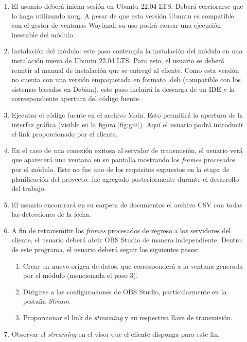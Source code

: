 \begin{enumerate}
	\item El usuario deberá iniciar sesión en Ubuntu 22.04 LTS. Deberá cerciorarse que lo haga utilizando xorg. A pesar de que esta versión Ubuntu es compatible con el gestor de ventanas Wayland, su uso podrá causar una ejecución inestable del módulo. 
	\item Instalación del módulo: este paso contempla la instalación del módulo en una instalación nueva de Ubuntu 22.04 LTS. Para esto, el usuario se deberá remitir al manual de instalación que se entregó al cliente. Como esta versión no cuenta con una versión empaquetada en formato .deb (compatible con los sistemas basados en Debian), este paso incluirá la descarga de un IDE y la correspondiente apertura del código fuente.
	\item Ejecutar el código fuente en el archivo Main. Esto permitirá la apertura de la interfaz gráfica (visible en la figura \ref{fig:gui}). Aquí el usuario podrá introducir el link proporcionado por el cliente.
	\item En el caso de una conexión exitosa al servidor de transmisión, el usuario verá que aparecerá una ventana en su pantalla mostrando los \textit{frames} procesados por el módulo. Este no fue uno de los requisitos expuestos en la etapa de planificación del proyecto: fue agregado posteriormente durante el desarrollo del trabajo.  
	\item El usuario encontrará en su carpeta de documentos el archivo CSV con todas las detecciones de la fecha.
	\item A fin de retransmitir los \textit{frames} procesados de regreso a los servidores del cliente, el usuario deberá abrir OBS Studio de manera independiente. Dentro de este programa, el usuario deberá seguir los siguientes pasos:
	\begin{enumerate}
		\item Crear un nuevo origen de datos, que corresponderá a la ventana generada por el módulo (mencionada el paso 3).
		\item Dirigirse a las configuraciones de OBS Studio, particularmente en la pestaña \textit{Stream}.
		\item Proporcionar el link de \textit{streaming} y su respectiva llave de transmisión.
	\end{enumerate}
	\item Observar el \textit{streaming} en el visor que el cliente disponga para este fin. 
\end{enumerate}

